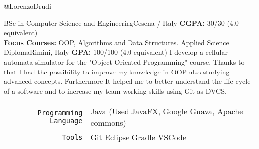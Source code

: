 \documentclass[
    10pt,
    A4,
    english,
    draft = false,
    twoside = false
]{article}
\begin{document}
	 {@LorenzoDrudi}

	\cvtitle{}	
	{BSc in Computer Science and Engineering}{Cesena / Italy}
	{\textbf{CGPA:} 30/30 (4.0 equivalent) \\
	\textbf{Focus Courses:} OOP, Algorithms and Data Structures.}
	{Applied Science Diploma}{Rimini, Italy}
	{\textbf{GPA:} 100/100 (4.0 equivalent)}
	{I develop a cellular automata simulator for the "Object-Oriented Programming" course. Thanks to that I had the possibility to improve my knowledge in OOP also studying advanced concepts. Furthermore It helped me to better understand the life-cycle of a software and to increase my team-working skills using Git as DVCS.} 
	\tab \begin{tabular}{r p{}}
		\texttt{\large Programming Language} &  Java (Used JavaFX, Google Guava, Apache commons) \\
		\texttt{\large Tools} & Git \cvContactSep Eclipse \cvContactSep Gradle \cvContactSep VSCode \\
	\end{tabular}\\~\\
	
\end{document}
